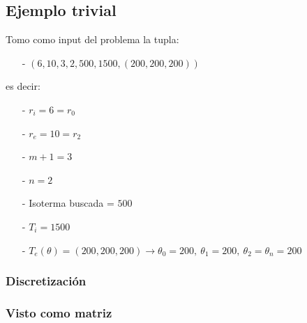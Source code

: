 \documentclass{article}
\begin{document}
\subsection*{Ejemplo trivial}

Tomo como input del problema la tupla:
\begin{itemize}
    \item[-] $(6, 10, 3, 2, 500, 1500, (200,200,200))$
\end{itemize}

\noindent es decir: 

\begin{itemize}
    \item[-] $r_i = 6 = r_0$ 
    \item[-] $r_e = 10 = r_2$
    \item[-] $m+1 = 3$
    \item[-] $n = 2$
    \item[-] Isoterma buscada = $500$ 
    \item[-] $T_i = 1500$
    \item[-] $T_e(\theta) = (200,200,200) \to \theta_0 = 200,~\theta_1 = 200, ~\theta_2 = \theta_n = 200$
\end{itemize}

\subsubsection*{Discretización}


\begin{center}
\end{center}    

\subsubsection*{Visto como matriz}
\end{document}
